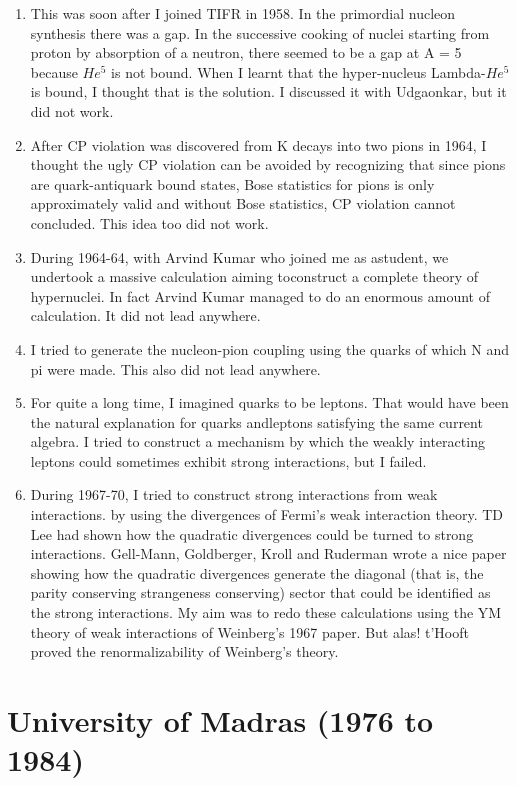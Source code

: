 \begin{enumerate}
\itemsep=0pt
\item This was soon after I joined TIFR in 1958. In the primordial nucleon 
synthesis there was a gap. In the successive cooking of nuclei starting 
from proton by absorption of a neutron, there seemed to be a gap at A = 
5 because $He^5$ is not bound. When I learnt that the hyper-nucleus 
Lambda-$He^5$ is bound, I thought that is the solution. I discussed it 
with Udgaonkar, but it did not work.
\item After CP violation was discovered from K decays into two pions in 
1964, I thought the ugly CP violation can be avoided by recognizing that 
since pions are quark-antiquark bound states, Bose statistics for pions 
is only approximately valid and without Bose statistics, CP violation 
cannot concluded. This idea too did not work.
\item During 1964-64, with Arvind Kumar who joined me as a\break student, we 
undertook a massive calculation aiming to\break construct a complete theory of 
hypernuclei. In fact Arvind Kumar managed to do an enormous amount of 
calculation. It did not lead anywhere.
\item I tried to generate the nucleon-pion coupling using the quarks of 
which N and pi were made. This also did not lead anywhere.
\item For quite a long time, I imagined quarks to be leptons. That would have 
been the natural explanation for quarks and\break leptons satisfying the same 
current algebra. I tried to construct a mechanism by which the weakly 
interacting leptons could sometimes exhibit strong interactions, but I 
failed.
\item During 1967-70, I tried to construct strong interactions from weak 
interactions. by using the divergences of Fermi's weak interaction 
theory. TD Lee had shown how the quadratic divergences could be turned 
to strong interactions. Gell-Mann, Goldberger, Kroll and Ruderman wrote 
a nice paper showing how the quadratic divergences generate the diagonal 
(that is, the parity conserving strangeness conserving) sector that 
could be identified as the strong interactions. My aim was to redo these 
calculations using the YM theory of weak interactions of Weinberg's 1967 
paper. But alas! t'Hooft proved the renormalizability of Weinberg's 
theory.
\end{enumerate}

\section*{University of Madras (1976 to 1984)}

